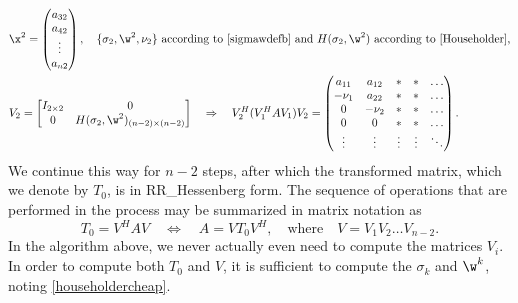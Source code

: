 \begin{align*}
    &\x^{2}=\begin{pmatrix} a_{32} \\ a_{42} \\ \vdots \\ a_{n2} \end{pmatrix}, \quad
    \textrm{$\{\sigma_{2},\w^{2},\nu_{2}\}$ according to \eqref{sigmawdefb} and $H(\sigma_{2},\w^{2})$
    according to \eqref{Householder},}\\
    &V_{2}=\begin{bmatrix} I_{2\times 2} & 0 \\ 0 & H(\sigma_{2},\w^{2})_{(n-2)\times (n-2)} \end{bmatrix}
    \quad \Rightarrow \quad
    V_{2}^{H}(V_{1}^{H}A V_{1})V_{2}=\begin{pmatrix} a_{11} & a_{12} & * & * & \hdots \\
				      -\nu_{1}   & a_{22} & * & * & \hdots \\
				      0          & -\nu_{2} & * & * & \hdots \\
				      0          & 0 & * & * & \hdots \\
				      \vdots     & \vdots & \vdots & \vdots & \ddots \end{pmatrix}.
\end{align*}
We continue this way for $n-2$ steps, after which the transformed
matrix, which we denote by $T_0$, is in RR_Hessenberg form.  The
sequence of operations that are performed in the process may be
summarized in matrix notation as
\begin{equation*}
    T_0=V^{H} A V \quad \Leftrightarrow \quad A=V T_0 V^{H}, \quad
    \textrm{where} \quad V=V_{1}V_{2}\hdots V_{n-2}.
\end{equation*}
In the algorithm above, we never actually even need to compute the
matrices $V_{i}$.  In order to compute both $T_0$ and $V$, it is
sufficient to compute the $\sigma_{k}$ and $\w^{k}$, noting
\eqref{householdercheap}.


